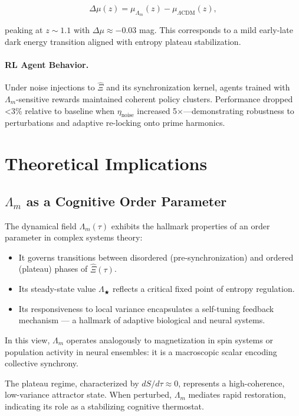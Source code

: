 \documentclass[12pt]{article}
\theoremstyle{plain}
\begin{document}
\begin{equation}
\Delta \mu(z) = \mu_{\Lambda_m}(z) - \mu_{\Lambda\text{CDM}}(z),
\end{equation}

peaking at $z \sim 1.1$ with $\Delta \mu \approx -0.03$ mag. This corresponds to a mild early-late dark energy transition aligned with entropy plateau stabilization.

\paragraph{RL Agent Behavior.} Under noise injections to $\hat{\Xi}$ and its synchronization kernel, agents trained with $\Lambda_m$-sensitive rewards maintained coherent policy clusters. Performance dropped <3\% relative to baseline when $\eta_{\text{noise}}$ increased 5×—demonstrating robustness to perturbations and adaptive re-locking onto prime harmonics.


\section{Theoretical Implications}

\subsection{$\Lambda_m$ as a Cognitive Order Parameter}

The dynamical field $\Lambda_m(\tau)$ exhibits the hallmark properties of an order parameter in complex systems theory:

\begin{itemize}
    \item It governs transitions between disordered (pre-synchronization) and ordered (plateau) phases of $\hat{\Xi}(\tau)$.
    \item Its steady-state value $\Lambda_★$ reflects a critical fixed point of entropy regulation.
    \item Its responsiveness to local variance encapsulates a self-tuning feedback mechanism — a hallmark of adaptive biological and neural systems.
\end{itemize}

In this view, $\Lambda_m$ operates analogously to magnetization in spin systems or population activity in neural ensembles: it is a macroscopic scalar encoding collective synchrony.

The plateau regime, characterized by $dS/d\tau \approx 0$, represents a high-coherence, low-variance attractor state. When perturbed, $\Lambda_m$ mediates rapid restoration, indicating its role as a stabilizing cognitive thermostat.
\end{document}
